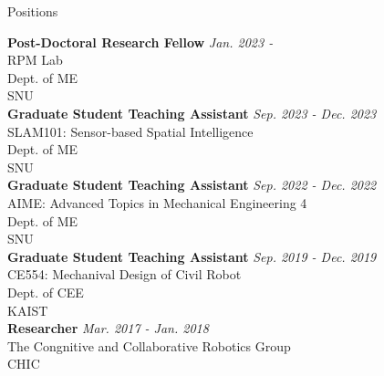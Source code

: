 \begin{rSection}{Positions}

{\bf Post-Doctoral Research Fellow} \hfill {\em Jan. 2023 -} \\
\acf{RPM} Lab \\ 
Dept. of \acf{ME} \\
\acf{SNU}\\

{\bf Graduate Student Teaching Assistant} \hfill {\em Sep. 2023 - Dec. 2023} \\
SLAM101: Sensor-based Spatial Intelligence \\ 
Dept. of \acf{ME} \\
\acf{SNU}\\

{\bf Graduate Student Teaching Assistant} \hfill {\em Sep. 2022 - Dec. 2022} \\
AIME: Advanced Topics in Mechanical Engineering 4 \\ 
Dept. of \acf{ME} \\
\acf{SNU}\\

{\bf Graduate Student Teaching Assistant} \hfill {\em Sep. 2019 - Dec. 2019} \\
CE554: Mechanival Design of Civil Robot \\ 
Dept. of \acf{CEE} \\
\acf{KAIST}\\

{\bf Researcher} \hfill {\em Mar. 2017 - Jan. 2018} \\
The Congnitive and Collaborative Robotics Group\\
\acf{CHIC}\\


\end{rSection}

